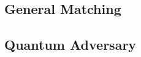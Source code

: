 \subsection{General Matching}

\subsection{Quantum Adversary}                                                                                                                                                                                                                                                                                                                                                                                                                                                                                                                                                                                                                                                                                                                                                                                                                                                                                                                                                                                                                                                                                                                                                                